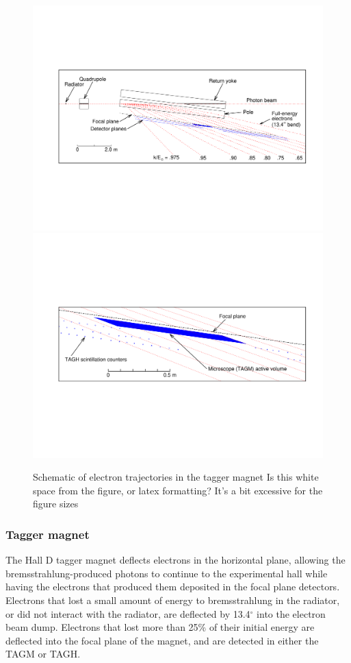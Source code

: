 \begin{figure}[tbp]
\begin{center}
   \includegraphics[width=0.95\linewidth]{figures/BEAM_taggerplot.pdf}
   \includegraphics[width=0.95\linewidth]{figures/BEAM_taggerdetectors.pdf}
\caption{Schematic of electron trajectories in the tagger magnet {\color{red}Is this white space from the figure, or latex formatting? It's a bit excessive for the figure sizes}
       \label{fig:beam:tagger-hall}  }

\end{center}
\end{figure}


\subsubsection{Tagger magnet \label{sec:tagMagnet}}
The Hall D tagger magnet deflects electrons in the horizontal plane, allowing the bremsstrahlung-produced photons to continue to the experimental hall while having the electrons that produced them deposited in the focal plane detectors.
Electrons that lost a small amount of energy to bremsstrahlung in the
radiator, or did not interact with the radiator, are deflected by 13.4$^\circ$ into the electron beam dump.
Electrons that lost more than 25\% of their initial energy are deflected into the focal plane of the magnet, and are detected in either the TAGM or TAGH.

